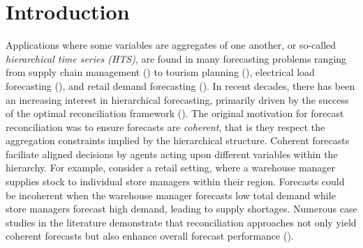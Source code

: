 \documentclass[a4paper,review,12pt,authoryear]{elsarticle}
\begin{document}
\section{Introduction}

Applications where some variables are aggregates of one another, or so-called \textit{hierarchical time series (HTS)}, are found in many forecasting problems ranging from supply chain management (\citealp{syntetosSupplyChainForecasting2016}) to tourism planning (\citealp{kourentzesCrosstemporalCoherentForecasts2019}), electrical load forecasting (\citealp{jeonProbabilisticForecastReconciliation2019}), and retail demand forecasting (\citealp{makridakisM5AccuracyCompetition2022}). In recent decades, there has been an increasing interest in hierarchical forecasting, primarily driven by the success of the optimal reconciliation framework (\citealp{hyndmanOptimalCombinationForecasts2011,wickramasuriyaOptimalForecastReconciliation2019, panagiotelisProbabilisticForecastReconciliation2023}). The original motivation for forecast reconciliation was to ensure forecasts are \textit{coherent}, that is they respect the aggregation constraints implied by the hierarchical structure. Coherent forecasts faciliate aligned decisions by agents acting upon different variables within the hierarchy. For example, consider a retail setting, where a warehouse manager supplies stock to individual store managers within their region. Forecasts could be incoherent when the warehouse manager forecasts low total demand while store managers forecast high demand, leading to supply shortages. Numerous case studies in the literature demonstrate that reconciliation approaches not only yield coherent forecasts but also enhance overall forecast performance (\citealp{AthanasopoulosForecastReconciliationReview2023}).
\end{document}
